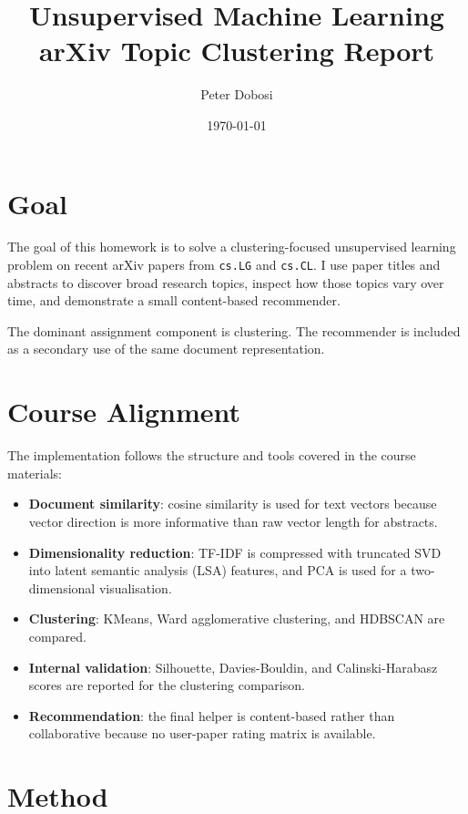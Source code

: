 \documentclass[11pt,a4paper]{article}
\title{Unsupervised Machine Learning\\arXiv Topic Clustering Report}
\author{Peter Dobosi}
\date{\today}
\begin{document}
\maketitle

\section*{Goal}

The goal of this homework is to solve a clustering-focused unsupervised
learning problem on recent arXiv papers from \texttt{cs.LG} and
\texttt{cs.CL}. I use paper titles and abstracts to discover broad research
topics, inspect how those topics vary over time, and demonstrate a small
content-based recommender.

The dominant assignment component is clustering. The recommender is included
as a secondary use of the same document representation.

\section*{Course Alignment}

The implementation follows the structure and tools covered in the course
materials:

\begin{itemize}[leftmargin=*,itemsep=2pt]
    \item \textbf{Document similarity}: cosine similarity is used for text
    vectors because vector direction is more informative than raw vector
    length for abstracts.
    \item \textbf{Dimensionality reduction}: TF-IDF is compressed with
    truncated SVD into latent semantic analysis (LSA) features, and PCA is
    used for a two-dimensional visualisation.
    \item \textbf{Clustering}: KMeans, Ward agglomerative clustering, and
    HDBSCAN are compared.
    \item \textbf{Internal validation}: Silhouette, Davies-Bouldin, and
    Calinski-Harabasz scores are reported for the clustering comparison.
    \item \textbf{Recommendation}: the final helper is content-based rather
    than collaborative because no user-paper rating matrix is available.
\end{itemize}

\section*{Method}
\end{document}
